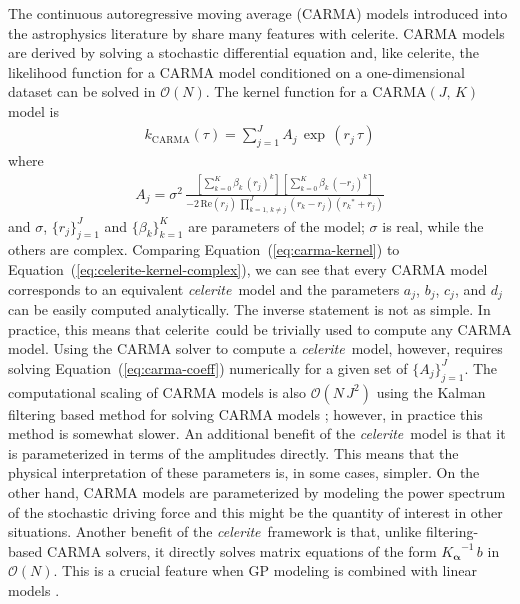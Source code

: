 \documentclass[manuscript, letterpaper]{aastex6}
\makeatletter
\let\origsubsection\subsection
\renewcommand\subsection{\@ifstar{\starsubsection}{\nostarsubsection}}
\newcommand\nostarsubsection[1]{\subsectionprelude\origsubsection{#1}}
\newcommand\starsubsection[1]{\subsectionprelude\origsubsection*{#1}}
\newcommand\subsectionprelude{\vspace{1em}}
\newcommand{\project}[1]{\textsf{#1}}
\newcommand{\celerite}{\project{celerite}}
\newcommand{\celeriteterm}{\emph{celerite}}
\renewcommand{\eqref}[1]{\ref{eq:#1}}
\newcommand{\Eq}[1]{Equation~(\eqref{#1})}
\newcommand{\eq}[1]{\Eq{#1}}
\newcommand{\eqlabel}[1]{\label{eq:#1}}
\newcommand{\bvec}[1]{{\ensuremath{\boldsymbol{#1}}}}
\newcommand{\response}[1]{{\color{blue}#1}}
\makeatother
\begin{document}
\response{
The continuous autoregressive moving average (CARMA) models introduced into
the astrophysics literature by \citet{Kelly:2014} share many features with
\celerite.
CARMA models are derived by solving a stochastic differential equation and,
like \celerite, the likelihood function for a CARMA model conditioned on a
one-dimensional dataset can be solved in $\mathcal{O}(N)$.
The kernel function for a CARMA$(J,\,K)$ model is \citep{Kelly:2014}
\begin{eqnarray}\eqlabel{carma-kernel}
k_\mathrm{CARMA}(\tau) = \sum_{j=1}^J A_j\,\exp\,(r_j\,\tau)
\end{eqnarray}
where
\begin{eqnarray}\eqlabel{carma-coeff}
A_j = \sigma^2 \,\frac{\left[\sum_{k=0}^K\beta_k\,{(r_j)}^k\right]\,
    \left[\sum_{k=0}^K\beta_k\,{(-r_j)}^k\right]}
    {-2\,\mathrm{Re}(r_j)\,\prod_{k=1,\,k \ne j}^{J}(r_k-r_j)({r_k}^*+r_j)}
\end{eqnarray}
and $\sigma$, $\{r_j\}_{j=1}^J$ and $\{\beta_k\}_{k=1}^K$ are parameters of
the model; $\sigma$ is real, while the others are complex.
Comparing \eq{carma-kernel} to \eq{celerite-kernel-complex}, we can see that
every CARMA model corresponds to an equivalent \celeriteterm\ model and the
parameters $a_j$, $b_j$, $c_j$, and $d_j$ can be easily computed analytically.
The inverse statement is not as simple.
In practice, this means that \celerite\ could be trivially used to compute any
CARMA model.
Using the CARMA solver to compute a \celeriteterm\ model, however, requires
solving \eq{carma-coeff} numerically for a given set of $\{A_j\}_{j=1}^J$.
The computational scaling of CARMA models is also $\mathcal{O}(N\,J^2)$ using
the Kalman filtering based method for solving CARMA models \citep{Kelly:2014};
however, in practice this method is somewhat slower.
An additional benefit of the \celeriteterm\ model is that it is parameterized in terms
of the amplitudes directly.
This means that the physical interpretation of these parameters is, in some
cases, simpler.
On the other hand, CARMA models are parameterized by modeling the power
spectrum of the stochastic driving force and this might be the quantity of
interest in other situations.
Another benefit of the \celeriteterm\ framework is that, unlike
filtering-based CARMA solvers, it directly solves matrix equations of the form
${K_\bvec{\alpha}}^{-1}\,b$ in $\mathcal{O}(N)$.
This is a crucial feature when GP modeling is combined with linear models
\citep[for example][]{Luger:2017}.
}


\subsection{Other scalable methods}
\end{document}
